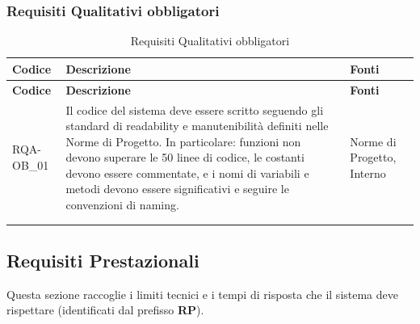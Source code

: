 \subsubsection{Requisiti Qualitativi obbligatori}
\renewcommand{\arraystretch}{1.15}
\begin{longtable}{|>{\raggedright}p{}|>{\raggedright\arraybackslash}p{}|>{\raggedright\arraybackslash}p{}|}
    \hline
    \rowcolor[gray]{0.9}
    \textbf{Codice} & \textbf{Descrizione} & \textbf{Fonti} \\
    \hline
    \endfirsthead
    \hline
    \rowcolor[gray]{0.9}
    \textbf{Codice} & \textbf{Descrizione} & \textbf{Fonti} \\
    \hline
    \endhead
    \hline
    RQA-OB\_01 \hypertarget{rqa-ob_1} & Il codice del sistema deve essere scritto seguendo gli standard di readability e manutenibilità definiti nelle Norme di Progetto. In particolare: funzioni non devono superare le 50 linee di codice, le costanti devono essere commentate, e i nomi di variabili e metodi devono essere significativi e seguire le convenzioni di naming. & Norme di Progetto, Interno \\
    \hline
    \multicolumn{3}{c}{} \\
    \caption{Requisiti Qualitativi obbligatori}\hypertarget{tab:qualitativi_obbligatori}\\
\end{longtable}

\newpage
\subsection{Requisiti Prestazionali}
Questa sezione raccoglie i limiti tecnici e i tempi di risposta che il sistema deve rispettare (identificati dal prefisso \textbf{RP}).

